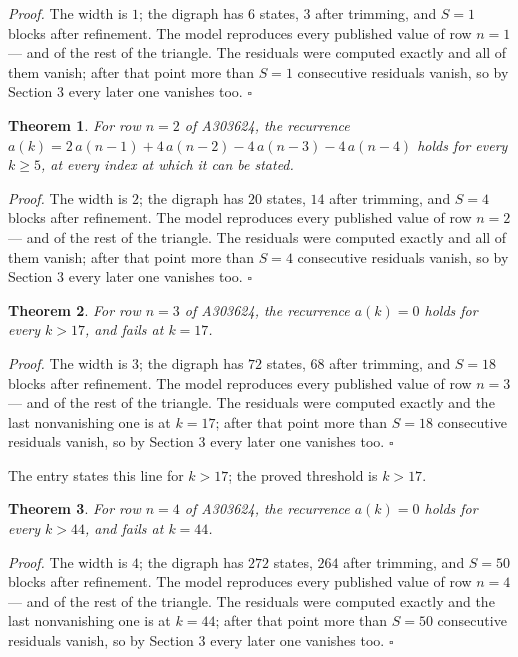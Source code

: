 \documentclass[11pt]{article}
\newtheorem{theorem}{Theorem}
\theoremstyle{definition}
\begin{document}
{\itshape Proof.} The width is $1$; the digraph has $6$ states, $3$ after trimming, and $S = 1$ blocks after refinement. The model reproduces every published value of row $n = 1$ --- and of the rest of the triangle. The residuals were computed exactly and all of them vanish; after that point more than $S = 1$ consecutive residuals vanish, so by Section 3 every later one vanishes too. $\square$

\begin{theorem} For row $n = 2$ of A303624, the recurrence $a(k) = 2\,a(n-1) + 4\,a(n-2) - 4\,a(n-3) - 4\,a(n-4)$ holds for every $k \ge 5$, at every index at which it can be stated.\end{theorem}

{\itshape Proof.} The width is $2$; the digraph has $20$ states, $14$ after trimming, and $S = 4$ blocks after refinement. The model reproduces every published value of row $n = 2$ --- and of the rest of the triangle. The residuals were computed exactly and all of them vanish; after that point more than $S = 4$ consecutive residuals vanish, so by Section 3 every later one vanishes too. $\square$

\begin{theorem} For row $n = 3$ of A303624, the recurrence $a(k) = 0$ holds for every $k > 17$, and fails at $k = 17$.\end{theorem}

{\itshape Proof.} The width is $3$; the digraph has $72$ states, $68$ after trimming, and $S = 18$ blocks after refinement. The model reproduces every published value of row $n = 3$ --- and of the rest of the triangle. The residuals were computed exactly and the last nonvanishing one is at $k = 17$; after that point more than $S = 18$ consecutive residuals vanish, so by Section 3 every later one vanishes too. $\square$

The entry states this line for $k > 17$; the proved threshold is $k > 17$.

\begin{theorem} For row $n = 4$ of A303624, the recurrence $a(k) = 0$ holds for every $k > 44$, and fails at $k = 44$.\end{theorem}

{\itshape Proof.} The width is $4$; the digraph has $272$ states, $264$ after trimming, and $S = 50$ blocks after refinement. The model reproduces every published value of row $n = 4$ --- and of the rest of the triangle. The residuals were computed exactly and the last nonvanishing one is at $k = 44$; after that point more than $S = 50$ consecutive residuals vanish, so by Section 3 every later one vanishes too. $\square$
\end{document}
